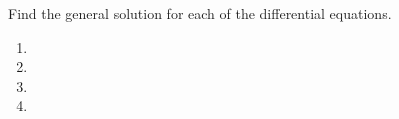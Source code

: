Find the general solution for each of the differential equations.
\begin{enumerate}[label=(\alph*)]
    \item 
    \item 
    \item 
    \item 
\end{enumerate}